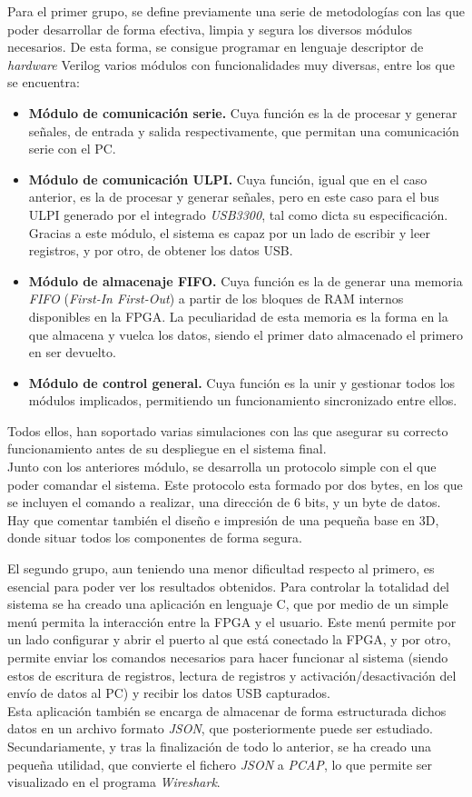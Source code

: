 \begin{resumen}
Para el primer grupo, se define previamente una serie de metodologías con las que poder desarrollar de forma efectiva, limpia y segura los diversos módulos necesarios. De esta forma, se consigue programar en lenguaje descriptor de \emph{hardware} Verilog varios módulos con funcionalidades muy diversas, entre los que se encuentra:
\begin{itemize}
    \item \textbf{Módulo de comunicación serie.} Cuya función es la de procesar y generar señales, de entrada y salida respectivamente, que permitan una comunicación serie con el PC.
    \item \textbf{Módulo de comunicación ULPI.} Cuya función, igual que en el caso anterior, es la de procesar y generar señales, pero en este caso para el bus ULPI generado por el integrado \emph{USB3300}, tal como dicta su especificación. Gracias a este módulo, el sistema es capaz por un lado de escribir y leer registros, y por otro, de obtener los datos USB.
    \item \textbf{Módulo de almacenaje FIFO.} Cuya función es la de generar una memoria \emph{FIFO} (\emph{First-In First-Out}) a partir de los bloques de RAM internos disponibles en la FPGA. La peculiaridad de esta memoria es la forma en la que almacena y vuelca los datos, siendo el primer dato almacenado el primero en ser devuelto.
    \item \textbf{Módulo de control general.} Cuya función es la unir y gestionar todos los módulos implicados, permitiendo un funcionamiento sincronizado entre ellos.
\end{itemize}
Todos ellos, han soportado varias simulaciones con las que asegurar su correcto funcionamiento antes de su despliegue en el sistema final. \\
Junto con los anteriores módulo, se desarrolla un protocolo simple con el que poder comandar el sistema. Este protocolo esta formado por dos bytes, en los que se incluyen el comando a realizar, una dirección de 6 bits, y un byte de datos. \\
Hay que comentar también el diseño e impresión de una pequeña base en 3D, donde situar todos los componentes de forma segura.

El segundo grupo, aun teniendo una menor dificultad respecto al primero, es esencial para poder ver los resultados obtenidos. Para controlar la totalidad del sistema se ha creado una aplicación en lenguaje C, que por medio de un simple menú permita la interacción entre la FPGA y el usuario. Este menú permite por un lado configurar y abrir el puerto al que está conectado la FPGA, y por otro, permite enviar los comandos necesarios para hacer funcionar al sistema (siendo estos de escritura de registros, lectura de registros y activación/desactivación del envío de datos al PC) y recibir los datos USB capturados. \\
Esta aplicación también se encarga de almacenar de forma estructurada dichos datos en un archivo formato \emph{JSON}, que posteriormente puede ser estudiado. Secundariamente, y tras la finalización de todo lo anterior, se ha creado una pequeña utilidad, que convierte el fichero \emph{JSON} a \emph{PCAP}, lo que permite ser visualizado en el programa \emph{Wireshark}.


\end{resumen}
